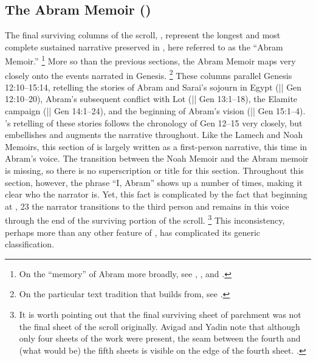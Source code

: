 \subsection{The Abram Memoir ()}

The final surviving columns of the scroll, , represent the longest and most complete sustained narrative preserved in \ga, here referred to as the ``Abram Memoir.''%
    \footnote{On the ``memory'' of Abram more broadly, see \cite{ego_falk-etal2010}, \cite{benzvi_edelman-benzvi2013}, \cite{hendel2005} and \cite{reed_jsj2009}.}
More so than the previous sections, the Abram Memoir maps very closely onto the events narrated in Genesis.%
    \footnote{On the particular text tradition that \ga builds from, see \cite{vanderkam1978}.}
These columns parallel Genesis 12:10--15:14, retelling the stories of Abram and Sarai's sojourn in Egypt (|| Gen 12:10--20), Abram's subsequent conflict with Lot (|| Gen 13:1--18), the Elamite campaign (|| Gen 14:1--24), and the beginning of Abram's vision (|| Gen 15:1--4). \GA's retelling of these stories follows the chronology of Gen 12--15 very closely, but embellishes and augments the narrative throughout. Like the Lamech and Noah Memoirs, this section of \ga is largely written as a first-person narrative, this time in Abram's voice. The transition between the Noah Memoir and the Abram memoir is missing, so there is no superscription or title for this section. Throughout this section, however, the phrase ``I, Abram'' shows up a number of times, making it clear who the narrator is. Yet, this fact is complicated by the fact that beginning at , 23 the narrator transitions to the third person and remains in this voice through the end of the surviving portion of the scroll.%
    \footnote{It is worth pointing out that the final surviving sheet of parchment was not the final sheet of the scroll originally. Avigad and Yadin note that although only four sheets of the work were present, the seam between the fourth and (what would be) the fifth sheets is visible on the edge of the fourth sheet. \cite*[14]{avigad-yadin1956}.}
This inconsistency, perhaps more than any other feature of \ga, has complicated its generic classification.

